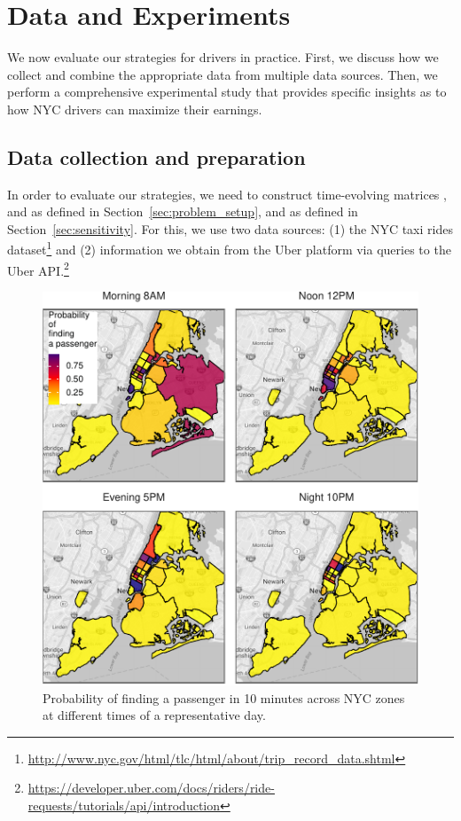 
\section{Data and Experiments}
\label{sec:experiments}
We now evaluate our strategies for drivers 
in practice. First, we discuss how we collect and combine the appropriate data 
from multiple data sources. Then, we perform a comprehensive experimental study
that provides
specific insights as to how NYC drivers can maximize their earnings.

\subsection{Data collection and preparation}
In order to evaluate our strategies, we need to construct 
time-evolving matrices 
{\empiricaltransitionmatrix}, {\traveltimematrix} and {\rewardsmatrix} as defined in Section~\ref{sec:problem_setup},
and {\countmatrix} as defined in Section~\ref{sec:sensitivity}.
For this, we use two data sources: (1) the NYC taxi rides 
dataset\footnote{\url{http://www.nyc.gov/html/tlc/html/about/trip_record_data.shtml}} and
(2) information we obtain from the Uber platform via queries to the Uber API.\footnote{\url{https://developer.uber.com/docs/riders/ride-requests/tutorials/api/introduction}}

\begin{figure}
	\centering
	\includegraphics{figures/successful_heatmap.pdf}
	\setlength{\belowcaptionskip}{-10pt}
	\caption{Probability of finding a passenger in 10 minutes across NYC zones at different times of a representative day.}
	\label{fig:successful_heatmap}
\end{figure}


